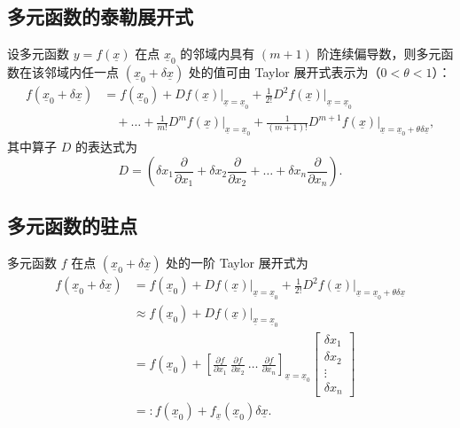 \subsection{多元函数的泰勒展开式}
设多元函数 \( y = f(\underline{x}) \) 在点 \( \underline{x}_0 \) 的邻域内具有 \( (m+1) \) 阶连续偏导数，则多元函数在该邻域内任一点 \( (\underline{x}_0 + \delta \underline{x}) \) 处的值可由 Taylor 展开式表示为（\( 0 < \theta < 1 \)）：
\[
\begin{aligned}
f(\underline{x}_0 + \delta \underline{x}) &= f(\underline{x}_0) + Df(\underline{x})\big|_{\underline{x}=\underline{x}_0} + \frac{1}{2!} D^2 f(\underline{x})\big|_{\underline{x}=\underline{x}_0} \\
&\quad + \dots + \frac{1}{m!} D^m f(\underline{x})\big|_{\underline{x}=\underline{x}_0} + \frac{1}{(m+1)!} D^{m+1} f(\underline{x})\big|_{\underline{x}=\underline{x}_0+\theta \delta \underline{x}},
\end{aligned}
\]
其中算子 \( D \) 的表达式为
\[
D = \left( \delta x_1 \frac{\partial}{\partial x_1} + \delta x_2 \frac{\partial}{\partial x_2} + \dots + \delta x_n \frac{\partial}{\partial x_n} \right).
\]

\subsection{多元函数的驻点}
多元函数 \( f \) 在点 \( (\underline{x}_0 + \delta \underline{x}) \) 处的一阶 Taylor 展开式为
\[
\begin{aligned}
f(\underline{x}_0 + \delta \underline{x}) &= f(\underline{x}_0) + Df(\underline{x})\big|_{\underline{x}=\underline{x}_0} + \frac{1}{2!} D^2 f(\underline{x})\big|_{\underline{x}=\underline{x}_0+\theta \delta \underline{x}} \\
&\approx f(\underline{x}_0) + Df(\underline{x})\big|_{\underline{x}=\underline{x}_0} \\
&= f(\underline{x}_0) + \left[ \frac{\partial f}{\partial x_1} \ \frac{\partial f}{\partial x_2} \ \dots \ \frac{\partial f}{\partial x_n} \right]_{\underline{x}=\underline{x}_0}
\begin{bmatrix}
\delta x_1 \\
\delta x_2 \\
\vdots \\
\delta x_n
\end{bmatrix} \\
&=: f(\underline{x}_0) + f_{\underline{x}}(\underline{x}_0) \delta \underline{x}.
\end{aligned}
\]


